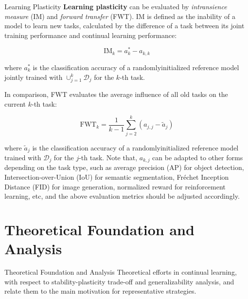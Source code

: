 \documentclass[9pt,dvipsnames]{beamer}
\begin{document}
\begin{frame}{Learning Plasticity}
    \textbf{Learning plasticity} can be evaluated by \textit{intransience measure} (IM) and \textit{forward transfer} (FWT). IM is defined as the inability of a model to learn new tasks, calculated by the difference of a task between its joint training performance and continual learning performance:

    $$
        \mathrm{IM}_{k}=a_{k}^{*}-a_{k, k}
    $$

    where $a_{k}^{*}$ is the classification accuracy of a randomlyinitialized reference model jointly trained with $\cup_{j=1}^{k} \mathcal{D}_{j}$ for the $k$-th task. 
    
    In comparison, FWT evaluates the average influence of all old tasks on the current $k$-th task:

    $$
        \mathrm{FWT}_{k}=\frac{1}{k-1} \sum_{j=2}^{k}\left(a_{j, j}-\tilde{a}_{j}\right)
    $$

    where $\tilde{a}_{j}$ is the classification accuracy of a randomlyinitialized reference model trained with $\mathcal{D}_{j}$ for the $j$-th task. Note that, $a_{k, j}$ can be adapted to other forms depending on the task type, such as average precision (AP) for object detection, Intersection-over-Union (IoU) for semantic segmentation, Fréchet Inception Distance (FID) for image generation, normalized reward for reinforcement learning, etc, and the above evaluation metrics should be adjusted accordingly.
\end{frame}
\section{Theoretical Foundation and Analysis}
\begin{frame}{Theoretical Foundation and Analysis}
	Theoretical efforts in continual learning, with respect to stability-plasticity trade-off and generalizability analysis, and relate them to the main motivation for representative strategies.
\end{frame}
\end{document}
